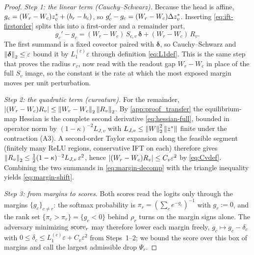 \begin{proof}
\emph{Step 1: the linear term (Cauchy--Schwarz).}
Because the head is affine, $g_c=(W_r-W_c)z^{*}_v+(b_r-b_c)$, so
$g_c'-g_c=(W_r-W_c)\Delta z^{*}_v$. Inserting \eqref{eq:ift-firstorder} splits this into a first-order
and a remainder part,
\begin{equation}
g_c'-g_c=(W_r-W_c)\,S_{c,v}\,\boldsymbol\delta+(W_r-W_c)\,R_v.
\label{eq:margin-decomp}
\end{equation}
The first summand is a fixed covector paired with $\boldsymbol\delta$, so Cauchy--Schwarz and
$\left\|\boldsymbol\delta\right\|_2\le\varepsilon$ bound it by $L_1^{(c)}\varepsilon$ through definition
\eqref{eq:L1def}. This is the same step that proves the radius $r_v$, now read with the readout gap
$W_r-W_c$ in place of the full $S_v$ image, so the constant is the rate at which the most exposed margin
moves per unit perturbation.

\emph{Step 2: the quadratic term (curvature).}
For the remainder, $\left|(W_r-W_c)R_v\right|\le\left\|W_r-W_c\right\|_2\left\|R_v\right\|_2$. By \cref{app:proof_transfer} the
equilibrium-map Hessian is the complete second derivative \eqref{eq:hessian-full}, bounded in operator
norm by $(1-\kappa)^{-2}L_{J,v}$ with $L_{J,v}\le\left\|W\right\|_2^2\left\|z^{*}\right\|$ finite under the contraction
(A3). A second-order Taylor expansion along the feasible segment (finitely many ReLU regions,
conservative IFT on each) therefore gives
$\left\|R_v\right\|_2\le\tfrac12(1-\kappa)^{-2}L_{J,v}\,\varepsilon^2$, hence
$\left|(W_r-W_c)R_v\right|\le C_v\varepsilon^2$ by \eqref{eq:Cvdef}. Combining the two summands in
\eqref{eq:margin-decomp} with the triangle inequality yields \eqref{eq:margin-shift}.

\emph{Step 3: from margins to scores.}
Both scores read the logits only through the margins $\{g_c\}_{c\ne r}$: the softmax probability is
$\pi_r=(\sum_c e^{-g_c})^{-1}$ with $g_r:=0$, and the rank set $\{\pi_c>\pi_r\}=\{g_c<0\}$ behind
$\rho_r$ turns on the margin signs alone. The adversary minimizing $\mathrm{score}_r$ may therefore lower each
margin freely, $g_c\mapsto g_c-\delta_c$ with $0\le\delta_c\le L_1^{(c)}\varepsilon+C_v\varepsilon^2$
from Steps~1--2; we bound the score over this box of margins and call the largest admissible drop
$\Psi_r$.


\end{proof}
